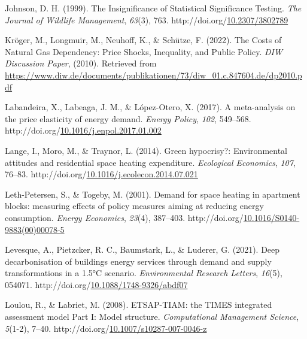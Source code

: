 \documentclass[12pt,twoside]{reedthesis}
\newlength{\cslhangindent}
\newenvironment{CSLReferences}[2] %
 {%
  \setlength{\parindent}{0pt}
  \ifodd #1 \everypar{\setlength{\hangindent}{\cslhangindent}}\ignorespaces\fi
  \ifnum #2 > 0
  \setlength{\parskip}{#2\baselineskip}
  \fi
 }%
 {}
\begin{document}
\begin{CSLReferences}{1}{0}
\leavevmode{}%
Johnson, D. H. (1999). The Insignificance of Statistical Significance Testing. \emph{The Journal of Wildlife Management}, \emph{63}(3), 763. http://doi.org/\href{https://doi.org/10.2307/3802789}{10.2307/3802789}

\leavevmode{}%
Kröger, M., Longmuir, M., Neuhoff, K., \& Schütze, F. (2022). The Costs of Natural Gas Dependency: Price Shocks, Inequality, and Public Policy. \emph{DIW Discussion Paper}, (2010). Retrieved from \url{https://www.diw.de/documents/publikationen/73/diw_01.c.847604.de/dp2010.pdf}

\leavevmode{}%
Labandeira, X., Labeaga, J. M., \& López-Otero, X. (2017). A meta-analysis on the price elasticity of energy demand. \emph{Energy Policy}, \emph{102}, 549--568. http://doi.org/\href{https://doi.org/10.1016/j.enpol.2017.01.002}{10.1016/j.enpol.2017.01.002}

\leavevmode{}%
Lange, I., Moro, M., \& Traynor, L. (2014). Green hypocrisy?: Environmental attitudes and residential space heating expenditure. \emph{Ecological Economics}, \emph{107}, 76--83. http://doi.org/\href{https://doi.org/10.1016/j.ecolecon.2014.07.021}{10.1016/j.ecolecon.2014.07.021}

\leavevmode{}%
Leth-Petersen, S., \& Togeby, M. (2001). Demand for space heating in apartment blocks: measuring effects of policy measures aiming at reducing energy consumption. \emph{Energy Economics}, \emph{23}(4), 387--403. http://doi.org/\href{https://doi.org/10.1016/S0140-9883(00)00078-5}{10.1016/S0140-9883(00)00078-5}

\leavevmode{}%
Levesque, A., Pietzcker, R. C., Baumstark, L., \& Luderer, G. (2021). Deep decarbonisation of buildings energy services through demand and supply transformations in a 1.5°C scenario. \emph{Environmental Research Letters}, \emph{16}(5), 054071. http://doi.org/\href{https://doi.org/10.1088/1748-9326/abdf07}{10.1088/1748-9326/abdf07}

\leavevmode{}%
Loulou, R., \& Labriet, M. (2008). ETSAP-TIAM: the TIMES integrated assessment model Part I: Model structure. \emph{Computational Management Science}, \emph{5}(1-2), 7--40. http://doi.org/\href{https://doi.org/10.1007/s10287-007-0046-z}{10.1007/s10287-007-0046-z}


\end{CSLReferences}
\end{document}
